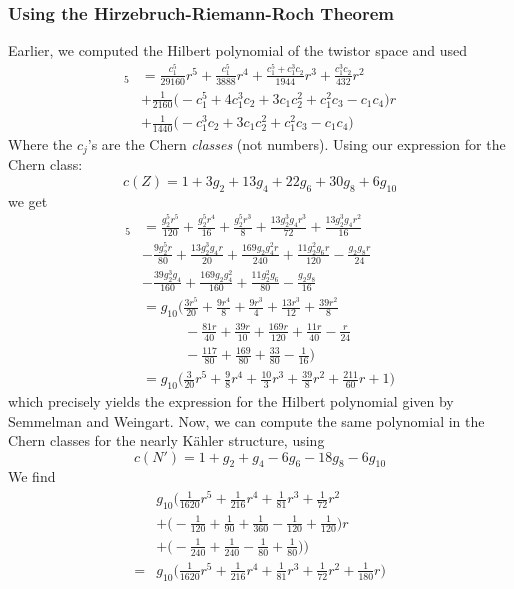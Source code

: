 \documentclass{scrartcl}
\begin{document}
\subsubsection{Using the Hirzebruch-Riemann-Roch Theorem}

Earlier, we computed the Hilbert polynomial of the twistor space and used
\begin{align*}
	[\ch(L^r)\td(Z)]_5&=\frac{c_1^5}{29160}r^5+\frac{c_1^5}{3888}r^4
	+\frac{c_1^5+c_1^3c_2}{1944}r^3+\frac{c_1^3c_2}{432}r^2\\
	&+\frac{1}{2160}\bigg(-c_1^5+4c_1^3c_2+3c_1c_2^2
	+c_1^2c_3-c_1c_4\bigg)r\\
	&+\frac{1}{1440}\bigg(-c_1^3c_2+3c_1c_2^2+c_1^2c_3-c_1c_4\bigg)
\end{align*}
Where the $c_j$'s are the Chern \emph{classes} (not numbers). Using our expression for the Chern class:
\begin{equation*}
	c(Z)=1+3g_2+13g_4+22g_6+30g_8+6g_{10}
\end{equation*}
we get 
\begin{align*}
	[\ch(L^r)\td(Z)]_5&=\frac{g_2^5r^5}{120}+\frac{g_2^5r^4}{16}
	+\frac{g_2^5r^3}{8}+\frac{13g_2^3g_4r^3}{72}
	+\frac{13g_2^3g_4r^2}{16}\\
	&-\frac{9g_2^5r}{80}+\frac{13 g_2^3g_4r}{20}+\frac{169 g_2g_4^2r}{240}
	+\frac{11g_2^2g_6r}{120}-\frac{g_2g_8r}{24}\\
	&-\frac{39g_2^3g_4}{160}+\frac{169 g_2g_4^2}{160}
	+\frac{11g_2^2g_6}{80}-\frac{g_2g_8}{16}\\
	&=g_{10}\Bigg(\frac{3r^5}{20}+\frac{9r^4}{8}+\frac{9r^3}{4}
	+\frac{13r^3}{12}+\frac{39r^2}{8}\\
	&\qquad \quad -\frac{81 r}{40}+\frac{39 r}{10} +\frac{169r}{120} +\frac{11r}{40}-\frac{r}{24} \\
	&\qquad \quad -\frac{117}{80}+\frac{169}{80}+\frac{33}{80}-\frac{1}{16}\Bigg)\\
	&=g_{10}\Bigg(\frac{3}{20}r^5+\frac{9}{8}r^4+\frac{10}{3}r^3
	+\frac{39}{8}r^2+\frac{211}{60}r+1\Bigg)
\end{align*}
which precisely yields the expression for the Hilbert polynomial given by Semmelman and Weingart. Now, we can compute the same polynomial in the Chern classes for the nearly K\"{a}hler structure, using
\begin{equation*}
	c(N')=1+g_2+g_4-6g_6-18g_8-6g_{10}
\end{equation*}
We find
\begin{align*}
	&g_{10}\Bigg(\frac{1}{1620}r^5+\frac{1}{216}r^4
	+\frac{1}{81}r^3+\frac{1}{72}r^2\\
	&+\bigg(-\frac{1}{120}+\frac{1}{90}+\frac{1}{360}
	-\frac{1}{120}+\frac{1}{120}\bigg)r\\
	&+\bigg(-\frac{1}{240}+\frac{1}{240}-\frac{1}{80}+\frac{1}{80}\bigg)\Bigg)\\
	=&g_{10}\Bigg(\frac{1}{1620}r^5+\frac{1}{216}r^4+\frac{1}{81}r^3+\frac{1}{72}r^2
	+\frac{1}{180}r\Bigg)
\end{align*}
\end{document}
